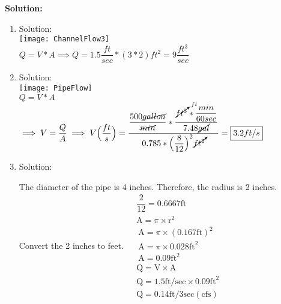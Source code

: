 \textbf{Solution:}\\

\begin{enumerate}

\item Solution:\\
\texttt{[image: ChannelFlow3]}\\
$Q=V*A \implies Q = 1.5 \dfrac{ft}{sec}*(3*2)ft^2=\boxed{9\dfrac{ft^3}{sec}}$

\item Solution:\\
\vspace{0.25cm}
\texttt{[image: PipeFlow]}\\
$Q=V*A$\\
$\implies V=\dfrac{Q}{A} \implies V \Big(\dfrac{ft}{s}\Big)= \dfrac{\dfrac{500\cancel{gallon}}{\cancel{min}}*\dfrac{\cancelto{ft}{ft^3}*\dfrac{min}{60sec}}{7.48\cancel{gal}}}{0.785*\Big(\dfrac{8}{12}\Big)^2\cancelto{}{ft^2}}=\boxed{3.2ft/s}$

\item Solution:\\

\vspace{0.25cm}

The diameter of the pipe is 4 inches. Therefore, the radius is 2 inches. Convert the 2 inches to feet.
$
\begin{aligned}
&\dfrac{2}{12}=0.6667 \mathrm{ft} \\
&\mathrm{A}=\pi \times \mathrm{r}^{2} \\
&\mathrm{~A}=\pi \times(0.167 \mathrm{ft})^{2} \\
&\mathrm{~A}=\pi \times 0.028 \mathrm{ft}^{2} \\
&\mathrm{~A}=0.09 \mathrm{ft}^{2} \\
&\mathrm{Q}=\mathrm{V} \times \mathrm{A} \\
&\mathrm{Q}=1.5 \mathrm{ft} / \mathrm{sec} \times 0.09 \mathrm{ft}^{2} \\
&\mathrm{Q}=0.14 \mathrm{ft} / 3 \mathrm{sec}(\mathrm{cfs})
\end{aligned}
$



\vspace{1cm}
\end{enumerate}
\vspace{1cm}

